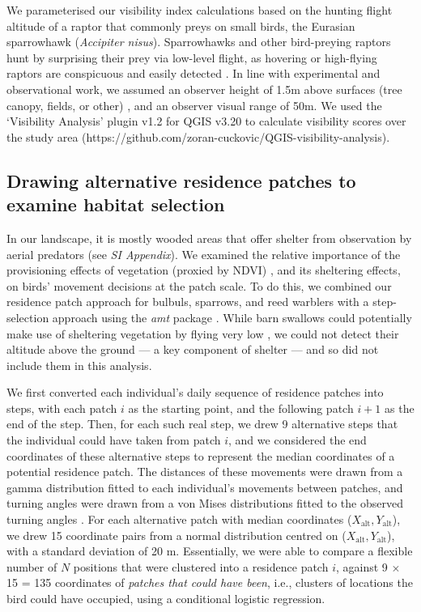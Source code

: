 \begin{refsection}
We parameterised our visibility index calculations based on the hunting flight altitude of a raptor that commonly preys on small birds, the Eurasian sparrowhawk (\textit{Accipiter nisus}).
Sparrowhawks and other bird-preying raptors hunt by surprising their prey via low-level flight, as hovering or high-flying raptors are conspicuous and easily detected \cite{krams2001,krams2020}.
In line with experimental and observational work, we assumed an observer height of 1.5m above surfaces (tree canopy, fields, or other) \citep{seress2011,krams2020}, and an observer visual range of 50m.
We used the `Visibility Analysis' plugin v1.2 for QGIS v3.20 to calculate visibility scores over the study area (https://github.com/zoran-cuckovic/QGIS-visibility-analysis).

\subsection{Drawing alternative residence patches to examine habitat selection}

In our landscape, it is mostly wooded areas that offer shelter from observation by aerial predators (see \textit{SI Appendix}).
We examined the relative importance of the provisioning effects of vegetation (proxied by NDVI) \cite{pettorelli2011}, and its sheltering effects, on birds' movement decisions at the patch scale.
To do this, we combined our residence patch approach for bulbuls, sparrows, and reed warblers with a step-selection approach \citep{thurfjell2014,avgar2016,fieberg2021} using the \textit{amt} package \citep{signer2019}.
While barn swallows could potentially make use of sheltering vegetation by flying very low \cite{warrick2016}, we could not detect their altitude above the ground --- a key component of shelter --- and so did not include them in this analysis.

We first converted each individual's daily sequence of residence patches into steps, with each patch $i$ as the starting point, and the following patch $i+1$ as the end of the step.
Then, for each such real step, we drew 9 alternative steps that the individual could have taken from patch $i$, and we considered the end coordinates of these alternative steps to represent the median coordinates of a potential residence patch.
The distances of these movements were drawn from a gamma distribution fitted to each individual's movements between patches, and turning angles were drawn from a von Mises distributions fitted to the observed turning angles \citep{signer2019}.
For each alternative patch with median coordinates ($X_\text{alt}, Y_\text{alt}$), we drew 15 coordinate pairs from a normal distribution centred on ($X_\text{alt}, Y_\text{alt}$), with a standard deviation of 20 m.
Essentially, we were able to compare a flexible number of $N$ positions that were clustered into a residence patch $i$, against 9 $ \times$ 15 = 135 coordinates of \textit{patches that could have been}, i.e., clusters of locations the bird could have occupied, using a conditional logistic regression.


\end{refsection}

